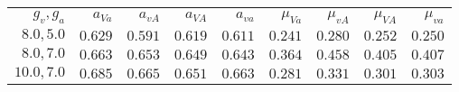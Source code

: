 {\small%
\begin{tabular}{r|rrrrrrrr}
$g_v,g_a$ & $a_{\mathit{Va}}$ & $a_{\mathit{vA}}$ & $a_{\mathit{VA}}$ & $a_{\mathit{va}}$ & $\mu_{\mathit{Va}}$ & $\mu_{\mathit{vA}}$ & $\mu_{\mathit{VA}}$ & $\mu_{\mathit{va}}$\\
$8.0,5.0$ & $0.629$ & $0.591$ & $0.619$ & $0.611$ & $0.241$ & $0.280$ & $0.252$ & $0.250$\\
$\mathbf{8.0,7.0}$ & $\mathbf{0.663}$ & $\mathbf{0.653}$ & $\mathbf{0.649}$ & $\mathbf{0.643}$ & $\mathbf{0.364}$ & $\mathbf{0.458}$ & $\mathbf{0.405}$ & $\mathbf{0.407}$\\
$10.0,7.0$ & $0.685$ & $0.665$ & $0.651$ & $0.663$ & $0.281$ & $0.331$ & $0.301$ & $0.303$\\
\end{tabular}
}